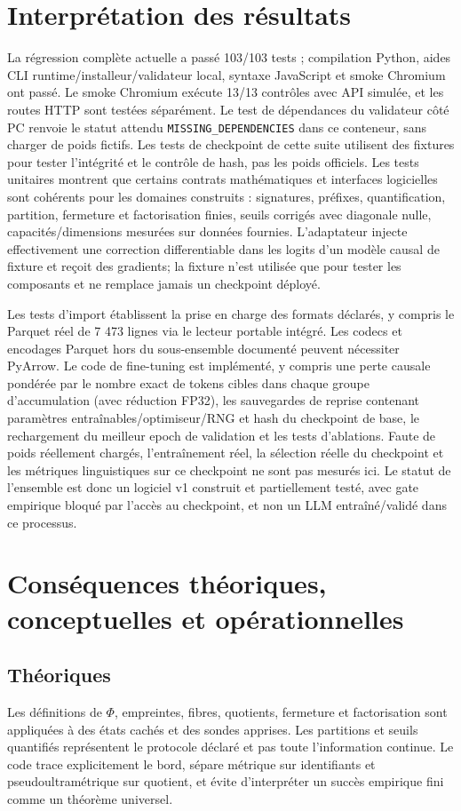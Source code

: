 \documentclass[11pt,a4paper]{article}
\begin{document}
\section{Interprétation des résultats}
La régression complète actuelle a passé 103/103 tests ; compilation Python, aides CLI runtime/installeur/validateur local, syntaxe JavaScript et smoke Chromium ont passé. Le smoke Chromium exécute 13/13 contrôles avec API simulée, et les routes HTTP sont testées séparément. Le test de dépendances du validateur côté PC renvoie le statut attendu \texttt{MISSING\_DEPENDENCIES} dans ce conteneur, sans charger de poids fictifs. Les tests de checkpoint de cette suite utilisent des fixtures pour tester l’intégrité et le contrôle de hash, pas les poids officiels. Les tests unitaires montrent que certains contrats mathématiques et interfaces logicielles sont cohérents pour les domaines construits : signatures, préfixes, quantification, partition, fermeture et factorisation finies, seuils corrigés avec diagonale nulle, capacités/dimensions mesurées sur données fournies. L'adaptateur injecte effectivement une correction differentiable dans les logits d'un modèle causal de fixture et reçoit des gradients; la fixture n'est utilisée que pour tester les composants et ne remplace jamais un checkpoint déployé.

Les tests d’import établissent la prise en charge des formats déclarés, y compris le Parquet réel de 7 473 lignes via le lecteur portable intégré. Les codecs et encodages Parquet hors du sous-ensemble documenté peuvent nécessiter PyArrow. Le code de fine-tuning est implémenté, y compris une perte causale pondérée par le nombre exact de tokens cibles dans chaque groupe d’accumulation (avec réduction FP32), les sauvegardes de reprise contenant paramètres entraînables/optimiseur/RNG et hash du checkpoint de base, le rechargement du meilleur epoch de validation et les tests d’ablations. Faute de poids réellement chargés, l’entraînement réel, la sélection réelle du checkpoint et les métriques linguistiques sur ce checkpoint ne sont pas mesurés ici. Le statut de l'ensemble est donc un logiciel v1 construit et partiellement testé, avec gate empirique bloqué par l'accès au checkpoint, et non un LLM entraîné/validé dans ce processus.

\section{Conséquences théoriques, conceptuelles et opérationnelles}
\subsection{Théoriques}
Les définitions de \(\Phi\), empreintes, fibres, quotients, fermeture et factorisation sont appliquées à des états cachés et des sondes apprises. Les partitions et seuils quantifiés représentent le protocole déclaré et pas toute l'information continue. Le code trace explicitement le bord, sépare métrique sur identifiants et pseudoultramétrique sur quotient, et évite d'interpréter un succès empirique fini comme un théorème universel.
\end{document}
